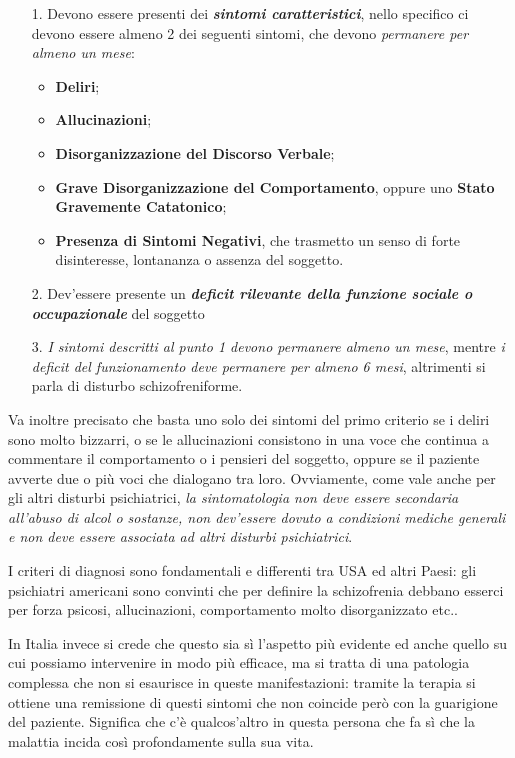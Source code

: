 \begin{itemize}
\item[1.]
  Devono essere presenti dei \textbf{\emph{sintomi caratteristici}},
  nello specifico ci devono essere almeno 2 dei seguenti sintomi, che
  devono \emph{permanere per almeno un mese}:

\begin{itemize}
\item
  \textbf{Deliri};
\item
  \textbf{Allucinazioni};
\item
  \textbf{Disorganizzazione del Discorso Verbale};
\item
  \textbf{Grave Disorganizzazione del Comportamento}, oppure uno
  \textbf{Stato Gravemente Catatonico};
\item
  \textbf{Presenza di Sintomi Negativi}, che trasmetto un senso di forte
  disinteresse, lontananza o assenza del soggetto.
\end{itemize}

\item[2.]
  Dev'essere presente un \textbf{\emph{deficit rilevante della funzione
  sociale o occupazionale}} del soggetto
\item[3.]
  \emph{I sintomi descritti al punto 1 devono permanere almeno un mese},
  mentre \emph{i deficit del funzionamento deve permanere per almeno 6
  mesi}, altrimenti si parla di disturbo schizofreniforme.
\end{itemize}

Va inoltre precisato che basta uno solo dei sintomi del primo criterio
se i deliri sono molto bizzarri, o se le allucinazioni consistono in una
voce che continua a commentare il comportamento o i pensieri del
soggetto, oppure se il paziente avverte due o più voci che dialogano tra
loro. Ovviamente, come vale anche per gli altri disturbi psichiatrici,
\emph{la sintomatologia non deve essere secondaria all'abuso di alcol o
sostanze, non dev'essere dovuto a condizioni mediche generali e non deve
essere associata ad altri disturbi psichiatrici}.

I criteri di diagnosi sono fondamentali e differenti tra USA ed altri
Paesi: gli psichiatri americani sono convinti che per definire la
schizofrenia debbano esserci per forza psicosi, allucinazioni,
comportamento molto disorganizzato etc..

In Italia invece si crede che questo sia sì l'aspetto più evidente ed
anche quello su cui possiamo intervenire in modo più efficace, ma si
tratta di una patologia complessa che non si esaurisce in queste
manifestazioni: tramite la terapia si ottiene una remissione di questi
sintomi che non coincide però con la guarigione del paziente. Significa
che c'è qualcos'altro in questa persona che fa sì che la malattia incida
così profondamente sulla sua vita.

